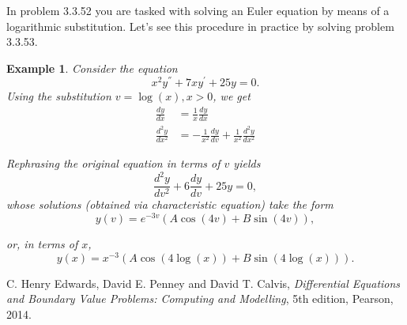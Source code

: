 \documentclass[11pt]{amsart}
\newtheorem{example}{Example}
\numberwithin{equation}{section}
\begin{document}
In problem 3.3.52 you are tasked with solving an Euler equation by means of a logarithmic substitution. Let's see this procedure in practice by solving problem 3.3.53.

\begin{example}
Consider the equation
\begin{equation*}
    x^2y^{''}+7xy^{'}+25y=0.
\end{equation*}
Using the substitution $v=\log(x), x>0$, we get 
\begin{align*}
    \frac{dy}{dx} & = \frac{1}{x}\frac{dy}{dx} \\ 
    \frac{d^2y}{dx^2} & = -\frac{1}{x^2}\frac{dy}{dv}+\frac{1}{x^2}\frac{d^2y}{dx^2}
\end{align*}

Rephrasing the original equation in terms of $v$ yields
\begin{equation*}
    \frac{d^2y}{dv^2}+6\frac{dy}{dv}+25y = 0,
\end{equation*}
whose solutions (obtained via characteristic equation) take the form
\begin{equation*}
    y(v)=e^{-3v}(A\cos(4v)+B\sin(4v)), 
\end{equation*}

or, in terms of $x$, 
\begin{equation*}
    y(x)=x^{-3}(A\cos(4\log(x))+B\sin(4\log(x))).
\end{equation*}
\end{example}

\begin{thebibliography}{0}

 C. Henry Edwards, David E. Penney and David T. Calvis, {\it Differential Equations and Boundary Value Problems: Computing and Modelling}, 5th edition, Pearson, 2014.

\end{thebibliography}
\end{document}
